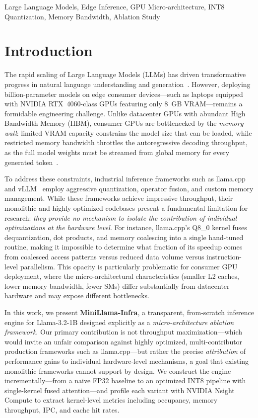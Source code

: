 \documentclass[conference]{IEEEtran}
\begin{document}
\begin{IEEEkeywords}
Large Language Models, Edge Inference, GPU Micro-architecture, INT8 Quantization, Memory Bandwidth, Ablation Study
\end{IEEEkeywords}

\section{Introduction}

The rapid scaling of Large Language Models (LLMs) has driven transformative progress in natural language understanding and generation~\cite{touvron2023llama}. However, deploying billion-parameter models on edge consumer devices---such as laptops equipped with NVIDIA RTX~4060-class GPUs featuring only 8~GB VRAM---remains a formidable engineering challenge. Unlike datacenter GPUs with abundant High Bandwidth Memory (HBM), consumer GPUs are bottlenecked by the \emph{memory wall}: limited VRAM capacity constrains the model size that can be loaded, while restricted memory bandwidth throttles the autoregressive decoding throughput, as the full model weights must be streamed from global memory for every generated token~\cite{dao2022flashattention}.

To address these constraints, industrial inference frameworks such as llama.cpp~\cite{llamacpp} and vLLM~\cite{kwon2023vllm} employ aggressive quantization, operator fusion, and custom memory management. While these frameworks achieve impressive throughput, their monolithic and highly optimized codebases present a fundamental limitation for research: \emph{they provide no mechanism to isolate the contribution of individual optimizations at the hardware level}. For instance, llama.cpp's Q8\_0 kernel fuses dequantization, dot products, and memory coalescing into a single hand-tuned routine, making it impossible to determine what fraction of its speedup comes from coalesced access patterns versus reduced data volume versus instruction-level parallelism. This opacity is particularly problematic for consumer GPU deployment, where the micro-architectural characteristics (smaller L2 caches, lower memory bandwidth, fewer SMs) differ substantially from datacenter hardware and may expose different bottlenecks.

In this work, we present \textbf{MiniLlama-Infra}, a transparent, from-scratch inference engine for Llama-3.2-1B designed explicitly as a \emph{micro-architecture ablation framework}. Our primary contribution is not throughput maximization---which would invite an unfair comparison against highly optimized, multi-contributor production frameworks such as llama.cpp---but rather the precise \emph{attribution} of performance gains to individual hardware-level mechanisms, a goal that existing monolithic frameworks cannot support by design. We construct the engine incrementally---from a naive FP32 baseline to an optimized INT8 pipeline with single-kernel fused attention---and profile each variant with NVIDIA Nsight Compute to extract kernel-level metrics including occupancy, memory throughput, IPC, and cache hit rates.
\end{document}
